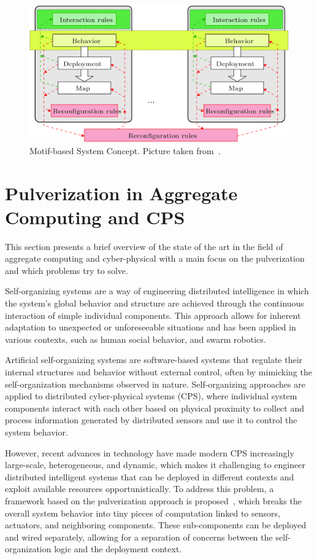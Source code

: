 \begin{figure}
	\centering
	\includegraphics[width=0.8\linewidth]{figures/motif-concept.png}
	\caption{Motif-based System Concept. Picture taken from~\cite{10.1007/978-3-030-03424-5_20}.}
	\label{fig:motif-concept}
\end{figure}


\section{Pulverization in Aggregate Computing and CPS}
\label{sec:pulverization-aggregate-computing-cps}

This section presents a brief overview of the state of the art in the field of aggregate computing and cyber-physical with a main focus on the
pulverization and which problems try to solve.

Self-organizing systems are a way of engineering distributed intelligence in which the system's global behavior and structure are achieved through
the continuous interaction of simple individual components. This approach allows for inherent adaptation to unexpected or unforeseeable situations
and has been applied in various contexts, such as human social behavior, and swarm robotics.

Artificial self-organizing systems are software-based systems that regulate their internal structures and behavior without external control, often by
mimicking the self-organization mechanisms observed in nature. Self-organizing approaches are applied to distributed cyber-physical systems (CPS),
where individual system components interact with each other based on physical proximity to collect and process information generated by distributed
sensors and use it to control the system behavior.

However, recent advances in technology have made modern CPS increasingly large-scale, heterogeneous, and dynamic, which makes it challenging to
engineer distributed intelligent systems that can be deployed in different contexts and exploit available resources opportunistically. To address
this problem, a framework based on the pulverization approach is proposed~\cite{fi12110203}, which breaks the overall system behavior into tiny
pieces of computation linked to sensors, actuators, and neighboring components. These sub-components can be deployed and wired separately, allowing
for a separation of concerns between the self-organization logic and the deployment context.

